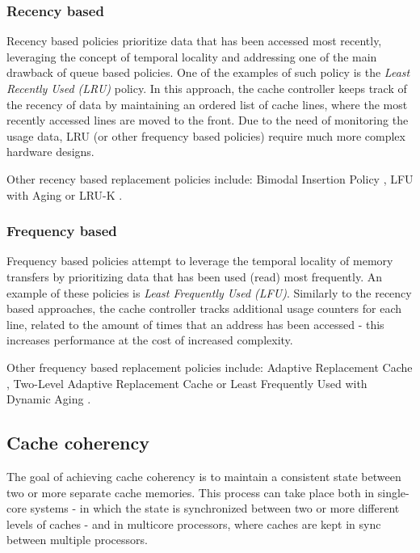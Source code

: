 \subsubsection{Recency based}
Recency based policies prioritize data that has been accessed most recently, leveraging the concept of temporal locality and addressing one of
the main drawback of queue based policies. One of the examples of such policy is the \textit{Least Recently Used (LRU)} policy. In this approach, the cache controller
keeps track of the recency of data by maintaining an ordered list of cache lines, where the most recently accessed lines are moved to the front. Due to the need of monitoring
the usage data, LRU (or other frequency based policies) require much more complex hardware designs. 

\vspace{10px}\noindent Other recency based replacement policies include: Bimodal Insertion Policy \cite{bip}, LFU with Aging or LRU-K \cite{eviction_summary}.

\subsubsection{Frequency based}
Frequency based policies attempt to leverage the temporal locality of memory transfers by prioritizing data that has been used (read) most frequently.
An example of these policies is \textit{Least Frequently Used (LFU)}. Similarly to the recency based approaches, the cache controller tracks additional usage counters
for each line, related to the amount of times that an address has been accessed - this increases performance at the cost of increased complexity.

\vspace{10px}\noindent Other frequency based replacement policies include: Adaptive Replacement Cache \cite{arc1}, Two-Level Adaptive Replacement Cache \cite{twoleveladaptive} or Least Frequently Used with Dynamic Aging \cite{jayarekha2010adaptive}.

\subsection{Cache coherency}

The goal of achieving cache coherency is to maintain a consistent state between two or
more separate cache memories. This process can take place both in single-core
systems - in which the state is synchronized between two or more different levels of caches
- and in multicore processors, where caches are kept in sync between multiple
processors.

